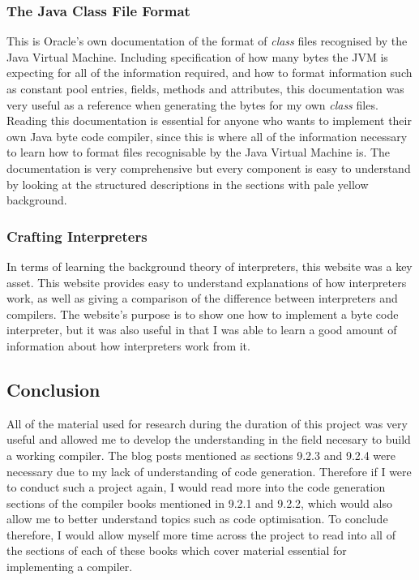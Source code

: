 \documentclass[a4paper, 11pt]{article}
\begin{document}
\subsubsection{The Java Class File Format\cite{ClassFile}}
This is Oracle's own documentation of the format of \textit{class} files recognised by the Java Virtual Machine. Including specification of how many bytes the JVM is expecting for all of the information required, and how to format information such as constant pool entries, fields, methods and attributes, this documentation was very useful as a reference when generating the bytes for my own \textit{class} files. Reading this documentation is essential for anyone who wants to implement their own Java byte code compiler, since this is where all of the information necessary to learn how to format files recognisable by the Java Virtual Machine is. The documentation is very comprehensive but every component is easy to understand by looking at the structured descriptions in the sections with pale yellow background.

\subsubsection{Crafting Interpreters \cite{Crafting Interpreters}}
In terms of learning the background theory of interpreters, this website was a key asset. This website provides easy to understand explanations of how interpreters work, as well as giving a comparison of the difference between interpreters and compilers. The website's purpose is to show one how to implement a byte code interpreter, but it was also useful in that I was able to learn a good amount of information about how interpreters work from it.

\subsection{Conclusion}
All of the material used for research during the duration of this project was very useful and allowed me to develop the understanding in the field necesary to build a working compiler. The blog posts mentioned as sections 9.2.3 and 9.2.4 were necessary due to my lack of understanding of code generation. Therefore if I were to conduct such a project again, I would read more into the code generation sections of the compiler books mentioned in 9.2.1 and 9.2.2, which would also allow me to better understand topics such as code optimisation. To conclude therefore, I would allow myself more time across the project to read into all of the sections of each of these books which cover material essential for implementing a compiler.
\end{document}
